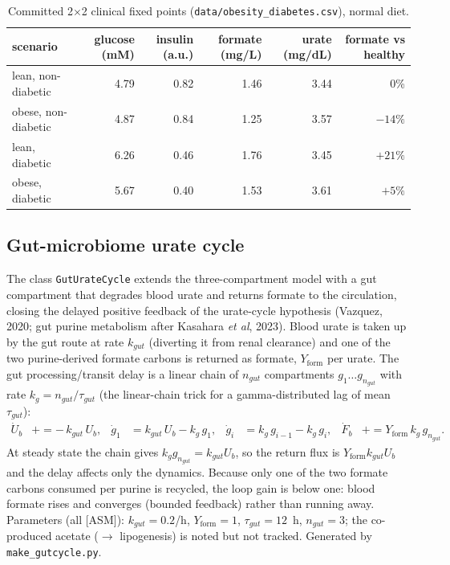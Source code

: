 \documentclass[11pt]{article}
\begin{document}
\begin{table}[h]\centering\small
\caption{Committed 2$\times$2 clinical fixed points (\texttt{data/obesity\_diabetes.csv}),
normal diet.}\label{tab:obes}
\small\setlength{\tabcolsep}{4pt}%
\begin{tabular}{@{}lrrrrr@{}}
\toprule
scenario & glucose (mM) & insulin (a.u.) & formate (mg/L) & urate (mg/dL) & formate vs healthy\\
\midrule
lean, non-diabetic & 4.79 & 0.82 & 1.46 & 3.44 & 0\%\\
obese, non-diabetic & 4.87 & 0.84 & 1.25 & 3.57 & $-14\%$\\
lean, diabetic & 6.26 & 0.46 & 1.76 & 3.45 & $+21\%$\\
obese, diabetic & 5.67 & 0.40 & 1.53 & 3.61 & $+5\%$\\
\bottomrule
\end{tabular}
\end{table}

\subsection{Gut-microbiome urate cycle}\label{sec:gut}
The class \texttt{GutUrateCycle} extends the three-compartment model with a gut
compartment that degrades blood urate and returns formate to the circulation,
closing the delayed positive feedback of the urate-cycle hypothesis (Vazquez,
2020; gut purine metabolism after Kasahara \textit{et al}, 2023). Blood urate is
taken up by the gut route at rate $k_{gut}$ (diverting it from renal clearance)
and one of the two purine-derived formate carbons is returned as formate,
$Y_{\mathrm{form}}$ per urate. The gut processing/transit delay is a linear chain
of $n_{gut}$ compartments $g_1\dots g_{n_{gut}}$ with rate $k_g=n_{gut}/\tau_{gut}$
(the linear-chain trick for a gamma-distributed lag of mean $\tau_{gut}$):
\begin{align}
\dot U_b &\mathrel{+}= -\,k_{gut}\,U_b, &
\dot g_1 &= k_{gut}\,U_b - k_g\,g_1, &
\dot g_i &= k_g\,g_{i-1} - k_g\,g_i, &
\dot F_b &\mathrel{+}= Y_{\mathrm{form}}\,k_g\,g_{n_{gut}}.
\end{align}
At steady state the chain gives $k_g g_{n_{gut}}=k_{gut}U_b$, so the return flux is
$Y_{\mathrm{form}}k_{gut}U_b$ and the delay affects only the dynamics. Because only
one of the two formate carbons consumed per purine is recycled, the loop gain is
below one: blood formate rises and converges (bounded feedback) rather than
running away. Parameters (all [ASM]): $k_{gut}=0.2$/h, $Y_{\mathrm{form}}=1$,
$\tau_{gut}=12$~h, $n_{gut}=3$; the co-produced acetate ($\to$ lipogenesis) is
noted but not tracked. Generated by \texttt{make\_gutcycle.py}.
\end{document}
